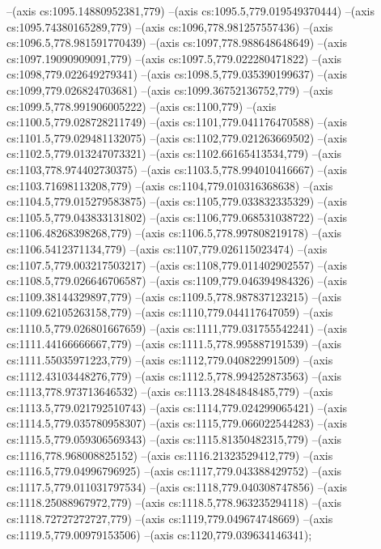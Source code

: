 --(axis cs:1095.14880952381,779)
--(axis cs:1095.5,779.019549370444)
--(axis cs:1095.74380165289,779)
--(axis cs:1096,778.981257557436)
--(axis cs:1096.5,778.981591770439)
--(axis cs:1097,778.988648648649)
--(axis cs:1097.19090909091,779)
--(axis cs:1097.5,779.022280471822)
--(axis cs:1098,779.022649279341)
--(axis cs:1098.5,779.035390199637)
--(axis cs:1099,779.026824703681)
--(axis cs:1099.36752136752,779)
--(axis cs:1099.5,778.991906005222)
--(axis cs:1100,779)
--(axis cs:1100.5,779.028728211749)
--(axis cs:1101,779.041176470588)
--(axis cs:1101.5,779.029481132075)
--(axis cs:1102,779.021263669502)
--(axis cs:1102.5,779.013247073321)
--(axis cs:1102.66165413534,779)
--(axis cs:1103,778.974402730375)
--(axis cs:1103.5,778.994010416667)
--(axis cs:1103.71698113208,779)
--(axis cs:1104,779.010316368638)
--(axis cs:1104.5,779.015279583875)
--(axis cs:1105,779.033832335329)
--(axis cs:1105.5,779.043833131802)
--(axis cs:1106,779.068531038722)
--(axis cs:1106.48268398268,779)
--(axis cs:1106.5,778.997808219178)
--(axis cs:1106.5412371134,779)
--(axis cs:1107,779.026115023474)
--(axis cs:1107.5,779.003217503217)
--(axis cs:1108,779.011402902557)
--(axis cs:1108.5,779.026646706587)
--(axis cs:1109,779.046394984326)
--(axis cs:1109.38144329897,779)
--(axis cs:1109.5,778.987837123215)
--(axis cs:1109.62105263158,779)
--(axis cs:1110,779.044117647059)
--(axis cs:1110.5,779.026801667659)
--(axis cs:1111,779.031755542241)
--(axis cs:1111.44166666667,779)
--(axis cs:1111.5,778.995887191539)
--(axis cs:1111.55035971223,779)
--(axis cs:1112,779.040822991509)
--(axis cs:1112.43103448276,779)
--(axis cs:1112.5,778.994252873563)
--(axis cs:1113,778.973713646532)
--(axis cs:1113.28484848485,779)
--(axis cs:1113.5,779.021792510743)
--(axis cs:1114,779.024299065421)
--(axis cs:1114.5,779.035780958307)
--(axis cs:1115,779.066022544283)
--(axis cs:1115.5,779.059306569343)
--(axis cs:1115.81350482315,779)
--(axis cs:1116,778.968008825152)
--(axis cs:1116.21323529412,779)
--(axis cs:1116.5,779.04996796925)
--(axis cs:1117,779.043388429752)
--(axis cs:1117.5,779.011031797534)
--(axis cs:1118,779.040308747856)
--(axis cs:1118.25088967972,779)
--(axis cs:1118.5,778.963235294118)
--(axis cs:1118.72727272727,779)
--(axis cs:1119,779.049674748669)
--(axis cs:1119.5,779.00979153506)
--(axis cs:1120,779.039634146341);

